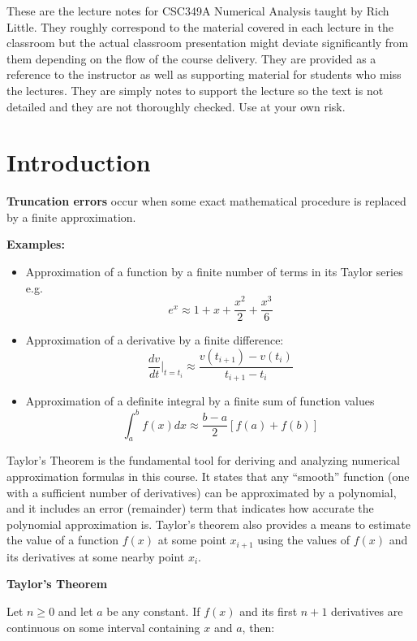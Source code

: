 \documentclass [titlepage,12pt,letter] {article}
\begin{document}
 


These are the lecture notes for CSC349A Numerical Analysis taught by
Rich Little. They roughly correspond to
the material covered in each lecture in the classroom but the actual
classroom presentation might deviate significantly from them depending
on the flow of the course delivery. They are provided as a reference to
the instructor as well as supporting material for students who miss
the lectures. They are simply notes to support the lecture so the text
is not detailed and they are not thoroughly checked. Use at your own
risk. 

\section{Introduction} 

{\bf Truncation errors} occur when some exact mathematical procedure is
replaced by a finite approximation.

\vspace{\baselineskip}

{\bf Examples:} 
\begin{itemize} 
\item Approximation of a function by a finite number of terms in its Taylor series e.g. 
\[ 
e^{x} \approx 1 + x + \frac{x^2}{2} + \frac{x^3}{6}
\]
\item Approximation of a derivative by a finite difference: 
\[
\frac{dv}{dt}|_{t=t_i} \approx \frac{v(t_{i+1}) - v(t_{i})}{t_{i+1} - t_{i}}
\]
\item Approximation of a definite integral by a finite sum of function values 
\[
\int_{a}^{b} f(x)dx \approx \frac{b-a}{2} \left[ f(a) + f(b) \right]
\]
\end{itemize} 

Taylor's Theorem is the fundamental tool for deriving and analyzing numerical
approximation formulas in this course. It states that any ``smooth''
function (one with a sufficient number of derivatives) can be
approximated by a polynomial, and it includes an error (remainder)
term that indicates how accurate the polynomial approximation
is. Taylor's theorem also provides a means to estimate the value of a
function $f(x)$ at some point $x_{i+1}$ using the values of $f(x)$ and
its derivatives at some nearby point $x_{i}$.

\newpage 
{\bf Taylor's Theorem} 

Let $n \geq 0$ and let $a$ be any constant. If $f(x)$ and its first $n+1$ derivatives are continuous on some interval containing $x$ and $a$, then: 
\end{document}
